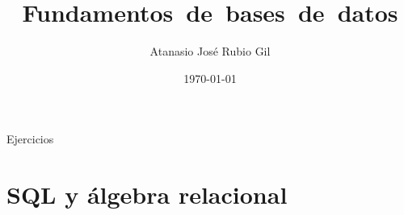 \documentclass[10pt]{report}
\author{Atanasio José Rubio Gil}
\title{Fundamentos~de~bases~de~datos}
\date{\today}
\begin{document}
            {Ejercicios}
            {}
\tableofcontents

%
% 
\chapter{SQL y álgebra relacional}
 \pagebreak

\end{document}
